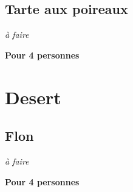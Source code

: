 \documentclass[10pt,a4paper]{report}
\begin{document}
    \section{Tarte aux poireaux}

    \begin{multicols}{2}
        \parbox[1cm]{\textwidth}{
            \begin{description}
                \item \textit{à faire}
            \end{description}
        }
        \columnbreak

        \textbf{Pour 4 personnes}
    \end{multicols}
    \newpage

    \chapter{Desert}
    \newpage

    \section{Flon}

    \begin{multicols}{2}
        \parbox[1cm]{\textwidth}{
            \begin{description}
                \item \textit{à faire}
            \end{description}
        }
        \columnbreak

        \textbf{Pour 4 personnes}
    \end{multicols}
    \newpage
\end{document}
